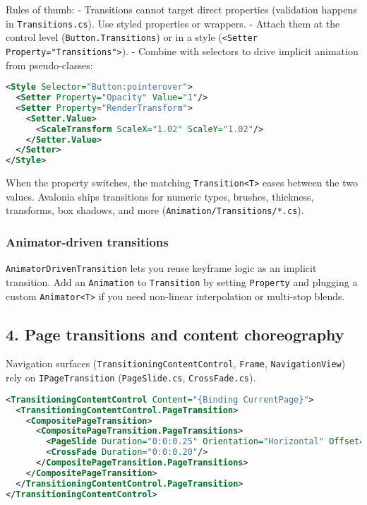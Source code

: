 Rules of thumb: - Transitions cannot target direct properties
(validation happens in \passthrough{\lstinline!Transitions.cs!}). Use
styled properties or wrappers. - Attach them at the control level
(\passthrough{\lstinline!Button.Transitions!}) or in a style
(\passthrough{\lstinline!<Setter Property="Transitions">!}). - Combine
with selectors to drive implicit animation from pseudo-classes:

\begin{lstlisting}[language=XML]
<Style Selector="Button:pointerover">
  <Setter Property="Opacity" Value="1"/>
  <Setter Property="RenderTransform">
    <Setter.Value>
      <ScaleTransform ScaleX="1.02" ScaleY="1.02"/>
    </Setter.Value>
  </Setter>
</Style>
\end{lstlisting}

When the property switches, the matching
\passthrough{\lstinline!Transition<T>!} eases between the two values.
Avalonia ships transitions for numeric types, brushes, thickness,
transforms, box shadows, and more
(\passthrough{\lstinline!Animation/Transitions/*.cs!}).

\subsubsection{Animator-driven
transitions}\label{animator-driven-transitions}

\passthrough{\lstinline!AnimatorDrivenTransition!} lets you reuse
keyframe logic as an implicit transition. Add an
\passthrough{\lstinline!Animation!} to
\passthrough{\lstinline!Transition!} by setting
\passthrough{\lstinline!Property!} and plugging a custom
\passthrough{\lstinline!Animator<T>!} if you need non-linear
interpolation or multi-stop blends.

\subsection{4. Page transitions and content
choreography}\label{page-transitions-and-content-choreography}

Navigation surfaces
(\passthrough{\lstinline!TransitioningContentControl!},
\passthrough{\lstinline!Frame!},
\passthrough{\lstinline!NavigationView!}) rely on
\passthrough{\lstinline!IPageTransition!}
(\passthrough{\lstinline!PageSlide.cs!},
\passthrough{\lstinline!CrossFade.cs!}).

\begin{lstlisting}[language=XML]
<TransitioningContentControl Content="{Binding CurrentPage}">
  <TransitioningContentControl.PageTransition>
    <CompositePageTransition>
      <CompositePageTransition.PageTransitions>
        <PageSlide Duration="0:0:0.25" Orientation="Horizontal" Offset="32"/>
        <CrossFade Duration="0:0:0.20"/>
      </CompositePageTransition.PageTransitions>
    </CompositePageTransition>
  </TransitioningContentControl.PageTransition>
</TransitioningContentControl>
\end{lstlisting}

